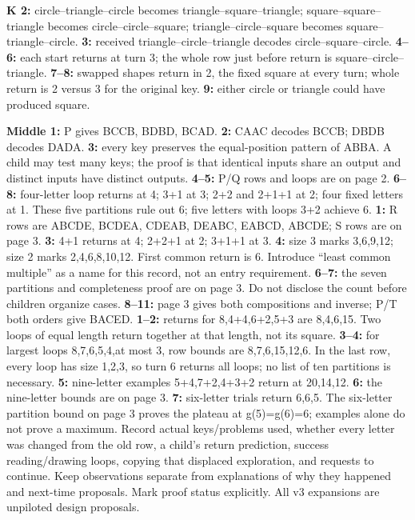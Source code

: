 \documentclass[12pt]{extarticle}
\begin{document}
\newpage
{}
\textbf{K 2:} circle--triangle--circle becomes triangle--square--triangle; square--square--triangle becomes circle--circle--square; triangle--circle--square becomes square--triangle--circle. \textbf{3:} received triangle--circle--triangle decodes circle--square--circle. \textbf{4--6:} each start returns at turn 3; the whole row just before return is square--circle--triangle. \textbf{7--8:} swapped shapes return in 2, the fixed square at every turn; whole return is 2 versus 3 for the original key. \textbf{9:} either circle or triangle could have produced square.\par
\textbf{Middle 1:} P gives BCCB, BDBD, BCAD. \textbf{2:} CAAC decodes BCCB; DBDB decodes DADA. \textbf{3:} every key preserves the equal-position pattern of ABBA. A child may test many keys; the proof is that identical inputs share an output and distinct inputs have distinct outputs. \textbf{4--5:} P/Q rows and loops are on page 2. \textbf{6--8:} four-letter loop returns at 4; 3+1 at 3; 2+2 and 2+1+1 at 2; four fixed letters at 1. These five partitions rule out 6; five letters with loops 3+2 achieve 6.
\textbf{1:} R rows are ABCDE, BCDEA, CDEAB, DEABC, EABCD, ABCDE; S rows are on page 3. \textbf{3:} 4+1 returns at 4; 2+2+1 at 2; 3+1+1 at 3. \textbf{4:} size 3 marks 3,6,9,12; size 2 marks 2,4,6,8,10,12. First common return is 6. Introduce ``least common multiple'' as a name for this record, not an entry requirement. \textbf{6--7:} the seven partitions and completeness proof are on page 3. Do not disclose the count before children organize cases. \textbf{8--11:} page 3 gives both compositions and inverse; P/T both orders give BACED.
\textbf{1--2:} returns for 8,4+4,6+2,5+3 are 8,4,6,15. Two loops of equal length return together at that length, not its square. \textbf{3--4:} for largest loops 8,7,6,5,4,at most 3, row bounds are 8,7,6,15,12,6. In the last row, every loop has size 1,2,3, so turn 6 returns all loops; no list of ten partitions is necessary. \textbf{5:} nine-letter examples 5+4,7+2,4+3+2 return at 20,14,12. \textbf{6:} the nine-letter bounds are on page 3. \textbf{7:} six-letter trials return 6,6,5. The six-letter partition bound on page 3 proves the plateau at g(5)=g(6)=6; examples alone do not prove a maximum.
Record actual keys/problems used, whether every letter was changed from the old row, a child's return prediction, success reading/drawing loops, copying that displaced exploration, and requests to continue. Keep observations separate from explanations of why they happened and next-time proposals. Mark proof status explicitly. All v3 expansions are unpiloted design proposals.
\end{document}
